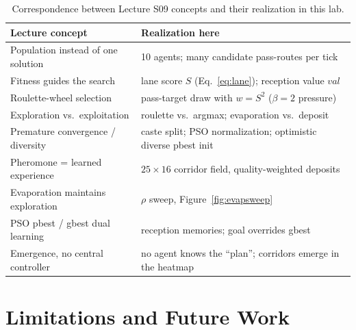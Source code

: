 \documentclass[11pt,a4paper]{article}
\begin{document}
\begin{table}[H]
\centering
\caption{Correspondence between Lecture S09 concepts and their realization in this lab.}
\label{tab:map}
\small
\begin{tabular}{@{}p{5.2cm}p{8.6cm}@{}}
\toprule
\textbf{Lecture concept} & \textbf{Realization here}\\
\midrule
Population instead of one solution & 10 agents; many candidate pass-routes per tick\\
Fitness guides the search & lane score $S$ (Eq.~\eqref{eq:lane}); reception value $val$\\
Roulette-wheel selection & pass-target draw with $w = S^2$ ($\beta = 2$ pressure)\\
Exploration vs.\ exploitation & roulette vs.\ argmax; evaporation vs.\ deposit\\
Premature convergence / diversity & caste split; PSO normalization; optimistic diverse pbest init\\
Pheromone = learned experience & $25\times16$ corridor field, quality-weighted deposits\\
Evaporation maintains exploration & $\rho$ sweep, Figure~\ref{fig:evapsweep}\\
PSO pbest / gbest dual learning & reception memories; goal overrides gbest\\
Emergence, no central controller & no agent knows the ``plan''; corridors emerge in the heatmap\\
\bottomrule
\end{tabular}
\end{table}

\section{Limitations and Future Work}
\end{document}
